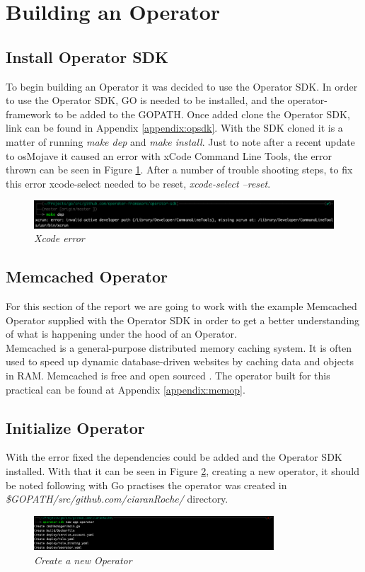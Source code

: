 \section{Building an Operator}
\label{sub:practical}

\subsection{Install Operator SDK}
To begin building an Operator it was decided to use the Operator SDK. In order to use the Operator SDK, GO is needed to be installed, and the operator-framework to be added to the GOPATH. Once added clone the Operator SDK, link can be found in Appendix \ref{appendix:opsdk}. With the SDK cloned it is a matter of running \textit{make dep} and \textit{make install}. Just to note after a recent update to osMojave it caused an error with xCode Command Line Tools, the error thrown can be seen in Figure \ref{img:p1}. After a number of trouble shooting steps, to fix this error xcode-select needed to be reset, \textit{xcode-select --reset}.
\begin{figure}[!ht]
\centering
\includegraphics*[width=1\textwidth]{images/p1.png}
\caption{\em Xcode error}
\label{img:p1}
\end{figure}

\subsection{Memcached Operator}
For this section of the report we are going to work with the example Memcached Operator supplied with the Operator SDK in order to get a better understanding of what is happening under the hood of an Operator.
\\Memcached is a general-purpose distributed memory caching system. It is often used to speed up dynamic database-driven websites by caching data and objects in RAM. Memcached is free and open sourced \citep{Memcached}. The operator built for this practical can be found at Appendix \ref{appendix:memop}.

\subsection{Initialize Operator}
With the error fixed the dependencies could be added and the Operator SDK installed. With that it can be seen in Figure \ref{img:p2}, creating a new operator, it should be noted following with Go practises the operator was created in \textit{\$GOPATH/src/github.com/ciaranRoche/} directory.
\begin{figure}[!hb]
\centering
\includegraphics*[width=0.8\textwidth]{images/p2.png}
\caption{\em Create a new Operator}
\label{img:p2}
\end{figure}

